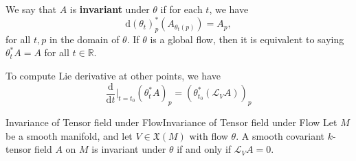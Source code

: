 \documentclass[../main.tex]{subfiles}
\begin{document}
We say that $A$ is \textbf{invariant} under $\theta$ if for each $t$, we have
\begin{equation}
  \mathrm{d} (\theta_t)_p^* (A_{\theta_t(p)}) = A_p,
\end{equation}
for all $t, p$ in the domain of $\theta$. If $\theta$ is a global flow, then it is equivalent to saying $\theta_t^* A = A$ for all $t\in \mathbb{R}$.

To compute Lie derivative at other points, we have
\begin{equation}
  \frac{\mathrm{d} }{\mathrm{d} t}\Big|_{t = t_0} (\theta_t^* A)_p = (\theta_{t_0}^* (\mathcal{L}_V A))_p
\end{equation}

\begin{theorem}{Invariance of Tensor field under Flow}{Invariance of Tensor field under Flow}
  Let $M$ be a smooth manifold, and let $V\in \mathfrak{X}(M)$ with flow $\theta$. A smooth covariant $k$-tensor field $A$ on $M$ is invariant under $\theta$ if and only if $\mathcal{L}_V A = 0$.
\end{theorem}
\end{document}
